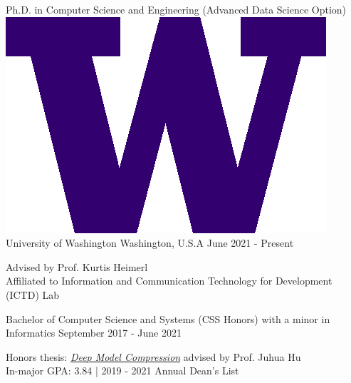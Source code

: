 

\begin{cventries}

  \cventry
    {Ph.D. in Computer Science and Engineering (Advanced Data Science Option)} %
    {\includegraphics[scale=0.13]{content/uw.png} University of Washington} %
    {Washington, U.S.A} %
    {June 2021 - Present} %
    {
      \begin{cvitems} %
       Advised by Prof. Kurtis Heimerl        \\
       Affiliated to Information and Communication Technology for Development (ICTD) Lab
      \end{cvitems}
    }
    
    
  \vspace{-1mm}
  \cventry
    {Bachelor of Computer Science and Systems (CSS Honors) with a minor in Informatics} %
    {} %
    {} %
    {September 2017 - June 2021} %
    {
      \begin{cvitems} %
          Honors thesis: \href{https://drive.google.com/file/d/173sEi_4_D20vfFhZp5GKooC18UyScgma/view?usp=sharing}{\textit{Deep Model Compression}} advised by Prof. Juhua Hu \\ 
          In-major GPA: 3.84 | 2019 - 2021 Annual Dean's List
      \end{cvitems}
    }
    

\end{cventries}
